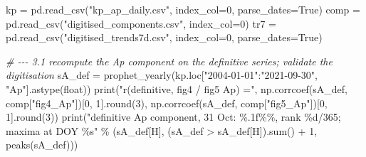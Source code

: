 \documentclass[
  10pt,
  a4paper,
]{article}
\newenvironment{Shaded}{}{}
\newcommand{\BuiltInTok}[1]{#1}
\newcommand{\CommentTok}[1]{\textit{#1}}
\newcommand{\DecValTok}[1]{#1}
\newcommand{\NormalTok}[1]{#1}
\newcommand{\OperatorTok}[1]{#1}
\newcommand{\SpecialCharTok}[1]{#1}
\newcommand{\StringTok}[1]{#1}
\newcommand{\VariableTok}[1]{#1}
\begin{document}
\begin{Shaded}
\begin{Highlighting}[]
\NormalTok{kp }\OperatorTok{=}\NormalTok{ pd.read\_csv(}\StringTok{"kp\_ap\_daily.csv"}\NormalTok{, index\_col}\OperatorTok{=}\DecValTok{0}\NormalTok{, parse\_dates}\OperatorTok{=}\VariableTok{True}\NormalTok{)}
\NormalTok{comp }\OperatorTok{=}\NormalTok{ pd.read\_csv(}\StringTok{"digitised\_components.csv"}\NormalTok{, index\_col}\OperatorTok{=}\DecValTok{0}\NormalTok{)}
\NormalTok{tr7 }\OperatorTok{=}\NormalTok{ pd.read\_csv(}\StringTok{"digitised\_trends7d.csv"}\NormalTok{, index\_col}\OperatorTok{=}\DecValTok{0}\NormalTok{, parse\_dates}\OperatorTok{=}\VariableTok{True}\NormalTok{)}

\CommentTok{\# {-}{-}{-} 3.1  recompute the Ap component on the definitive series; validate the digitisation}
\NormalTok{sA\_def }\OperatorTok{=}\NormalTok{ prophet\_yearly(kp.loc[}\StringTok{"2004{-}01{-}01"}\NormalTok{:}\StringTok{"2021{-}09{-}30"}\NormalTok{, }\StringTok{"Ap"}\NormalTok{].astype(}\BuiltInTok{float}\NormalTok{))}
\BuiltInTok{print}\NormalTok{(}\StringTok{"r(definitive, fig4 / fig5 Ap) ="}\NormalTok{,}
\NormalTok{      np.corrcoef(sA\_def, comp[}\StringTok{"fig4\_Ap"}\NormalTok{])[}\DecValTok{0}\NormalTok{, }\DecValTok{1}\NormalTok{].}\BuiltInTok{round}\NormalTok{(}\DecValTok{3}\NormalTok{),}
\NormalTok{      np.corrcoef(sA\_def, comp[}\StringTok{"fig5\_Ap"}\NormalTok{])[}\DecValTok{0}\NormalTok{, }\DecValTok{1}\NormalTok{].}\BuiltInTok{round}\NormalTok{(}\DecValTok{3}\NormalTok{))}
\BuiltInTok{print}\NormalTok{(}\StringTok{"definitive Ap component, 31 Oct: }\SpecialCharTok{\%.1f\%\%}\StringTok{, rank }\SpecialCharTok{\%d}\StringTok{/365; maxima at DOY }\SpecialCharTok{\%s}\StringTok{"}
      \OperatorTok{\%}\NormalTok{ (sA\_def[H], (sA\_def }\OperatorTok{\textgreater{}}\NormalTok{ sA\_def[H]).}\BuiltInTok{sum}\NormalTok{() }\OperatorTok{+} \DecValTok{1}\NormalTok{, peaks(sA\_def)))}


\end{Highlighting}
\end{Shaded}
\end{document}
